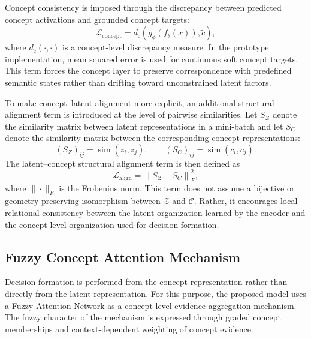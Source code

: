 \documentclass[runningheads]{llncs}
\begin{document}
Concept consistency is imposed through the discrepancy between predicted concept activations and grounded concept targets:
\begin{equation}
\mathcal{L}_{\mathrm{concept}} =
d_{\mathrm{c}}\!\left(g_{\phi}(f_{\theta}(x)), \tilde{c}\right),
\end{equation}
where $d_{\mathrm{c}}(\cdot,\cdot)$ is a concept-level discrepancy measure. In the prototype implementation, mean squared error is used for continuous soft concept targets. This term forces the concept layer to preserve correspondence with predefined semantic states rather than drifting toward unconstrained latent factors.

To make concept--latent alignment more explicit, an additional structural alignment term is introduced at the level of pairwise similarities. Let $S_Z$ denote the similarity matrix between latent representations in a mini-batch and let $S_C$ denote the similarity matrix between the corresponding concept representations:
\begin{equation}
(S_Z)_{ij} = \operatorname{sim}(z_i,z_j), \qquad
(S_C)_{ij} = \operatorname{sim}(c_i,c_j).
\end{equation}
The latent--concept structural alignment term is then defined as
\begin{equation}
\mathcal{L}_{\mathrm{align}} =
\left\| S_Z - S_C \right\|_{F}^{2},
\end{equation}
where $\|\cdot\|_{F}$ is the Frobenius norm. This term does not assume a bijective or geometry-preserving isomorphism between $\mathcal{Z}$ and $\mathcal{C}$. Rather, it encourages local relational consistency between the latent organization learned by the encoder and the concept-level organization used for decision formation.

\subsection{Fuzzy Concept Attention Mechanism}

Decision formation is performed from the concept representation rather than directly from the latent representation. For this purpose, the proposed model uses a Fuzzy Attention Network as a concept-level evidence aggregation mechanism. The fuzzy character of the mechanism is expressed through graded concept memberships and context-dependent weighting of concept evidence.
\end{document}
